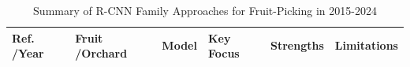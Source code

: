 \documentclass{ieeeaccess}
\begin{document}
\begin{table}[!htb]
\begin{tabular}{p{}p{}p{}p{}p{}p{}}
		\bottomrule
	\end{tabular}
\end{table}

\begin{table}[!htb]
	\centering
	\footnotesize
	\renewcommand{\arraystretch}{1.3}
	\addtocounter{table}{-1}
	\caption{Summary of R-CNN Family Approaches for Fruit-Picking in 2015-2024} 
	\begin{tabular}{p{}p{}p{}p{}p{}p{}}
	\toprule
	\textbf{Ref. \newline /Year} & \textbf{Fruit \newline /Orchard} & \textbf{Model} & 			\textbf{Key Focus} & \textbf{Strengths} & \textbf{Limitations} \\ \midrule


\end{tabular}
\end{table}
\end{document}
